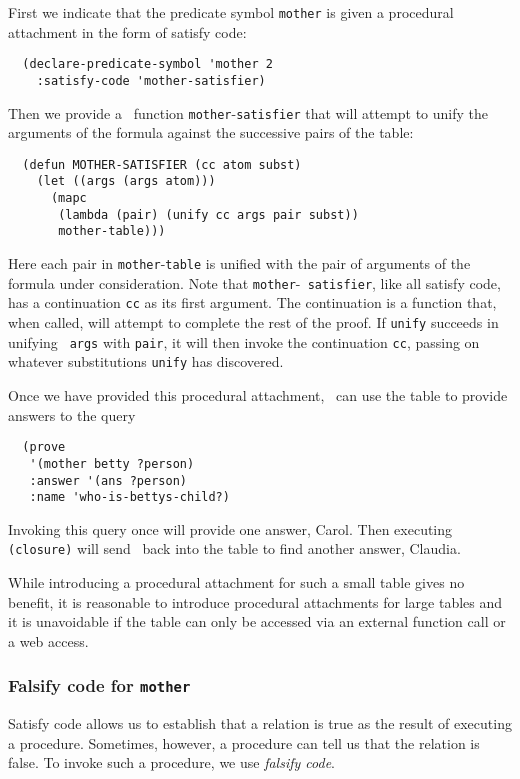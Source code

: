 First we indicate that the predicate symbol {\tt mother} is given a
procedural attachment in the form of satisfy code:
\begin{verbatim}
  (declare-predicate-symbol 'mother 2
    :satisfy-code 'mother-satisfier)
\end{verbatim}
Then we provide a \lisp\  function {\tt mother}-{\tt satisfier} that will
attempt to unify the arguments of the formula against the successive pairs
of the table:
\begin{verbatim}
  (defun MOTHER-SATISFIER (cc atom subst)
    (let ((args (args atom)))
      (mapc
       (lambda (pair) (unify cc args pair subst))
       mother-table)))
\end{verbatim}
Here each pair in {\tt mother}-{\tt table} is unified with the pair of
arguments of the formula under consideration.  Note that {\tt mother}-{\tt
satisfier}, like all satisfy code, has a continuation {\tt cc} as its first
argument.  The continuation is a function that, when called, will attempt to
complete the rest of the proof.  If {\tt unify} succeeds in unifying {\tt
args} with {\tt pair}, it will then invoke the continuation {\tt cc}, passing
on whatever substitutions {\tt unify} has discovered.

Once we have provided this procedural attachment, \snark\  can use the table
to provide answers to the query
\begin{verbatim}
  (prove
   '(mother betty ?person)
   :answer '(ans ?person)
   :name 'who-is-bettys-child?)
\end{verbatim}
Invoking this query once will provide one answer, Carol.  Then executing
\verb'(closure)' will send \snark\  back into the table to find another
answer, Claudia.

While introducing a procedural attachment for such a small table gives no
benefit, it is reasonable to introduce procedural attachments for large
tables and it is unavoidable if the table can only be accessed via an
external function call or a web access.

\subsubsection{Falsify code for {\tt mother}}

Satisfy code allows us to establish that a relation is true as the result of
executing a procedure.  Sometimes, however, a procedure can tell us that the
relation is false.  To invoke such a procedure, we use {\em falsify code}.

